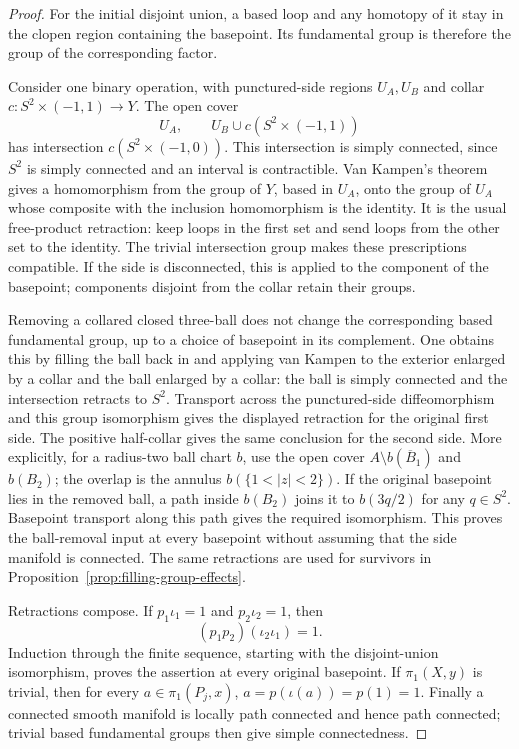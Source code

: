 \begin{proof}
For the initial disjoint union, a based loop and any homotopy of it stay
in the clopen region containing the basepoint.  Its fundamental group
is therefore the group of the corresponding factor.

Consider one binary operation, with punctured-side regions $U_A,U_B$ and
collar $c:S^2\times(-1,1)\to Y$.  The open cover
\[
 U_A,\qquad U_B\cup c(S^2\times(-1,1))
\]
has intersection $c(S^2\times(-1,0))$.  This intersection is simply
connected, since $S^2$ is simply connected and an interval is contractible.
Van Kampen's theorem \cite[Theorem 1.20, p.~43]{Hatcher} gives a homomorphism from the group of
$Y$, based in $U_A$, onto the group of $U_A$ whose composite with the
inclusion homomorphism is the identity.  It is the usual free-product
retraction: keep loops in the first set and send loops from the other set
to the identity.  The trivial intersection group makes these prescriptions
compatible.  If the side is disconnected, this is applied to the component
of the basepoint; components disjoint from the collar retain their groups.

Removing a collared closed three-ball does not change the corresponding
based fundamental group, up to a choice of basepoint in its complement.
One obtains this by filling the ball back in and applying van Kampen to
the exterior enlarged by a collar and the ball enlarged by a collar:
the ball is simply connected and the intersection retracts to $S^2$.
Transport across the punctured-side diffeomorphism and this group
isomorphism gives the displayed retraction for the original first side.
The positive half-collar gives the same conclusion for the second side.
More explicitly, for a radius-two ball chart $b$, use the open cover
$A\setminus b(\overline B_1)$ and $b(B_2)$; the overlap is the annulus
$b(\{1<|z|<2\})$.  If the original basepoint lies in the removed ball,
a path inside $b(B_2)$ joins it to $b(3q/2)$ for any $q\in S^2$.
Basepoint transport along this path gives the required isomorphism.
This proves the ball-removal input at every basepoint without assuming
that the side manifold is connected.  The same retractions are used for
survivors in Proposition~\ref{prop:filling-group-effects}.

Retractions compose.  If $p_1\iota_1=1$ and $p_2\iota_2=1$, then
\[
  (p_1p_2)(\iota_2\iota_1)=1.
\]
Induction through the finite sequence, starting with the disjoint-union
isomorphism, proves the assertion at every original basepoint.
If $\pi_1(X,y)$ is trivial, then for every $a\in\pi_1(P_j,x)$,
$a=p(\iota(a))=p(1)=1$.  Finally a connected smooth manifold is locally
path connected and hence path connected; trivial based fundamental groups
then give simple connectedness.
\end{proof}

